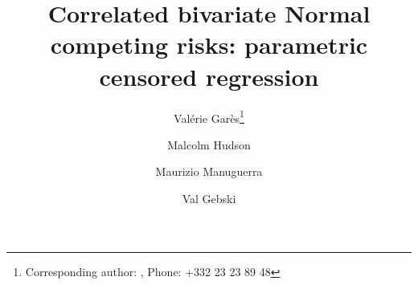 \documentclass[twoside,a4paper,12pt]{article}
\theoremstyle{plain}
\theoremstyle{definition}
\begin{document}

\title[Correlated bivariate Normal competing risks ]{Correlated bivariate Normal competing risks: parametric censored regression }
\author[Val\'{e}rie Gar\`{e}s {\it{et al.}}]{Val\'{e}rie Gar\`{e}s\footnote{Corresponding author: {}, Phone: +332 23 23 89 48}} 
\address[\inst{1}]{Univ Rennes, INSA, CNRS, IRMAR - UMR 6625, 20 Avenue des Buttes de Coësmes CS 70839, 35708 Rennes cedex 7}
\author[]{Malcolm Hudson}
\address[\inst{2}]{NHMRC Clinical Trials Centre | University of Sydney | Levels 4-6 Medical Foundation Building | 92-94 Parramatta Rd | Camperdown NSW 2050 | Australia}
\address[\inst{3}]{Department of Statistics | Macquarie University | Balaclava Road | North Ryde | NSW | 2109 | Australia}
\author[]{Maurizio Manuguerra }
\author[]{Val Gebski }

   
\end{document}
